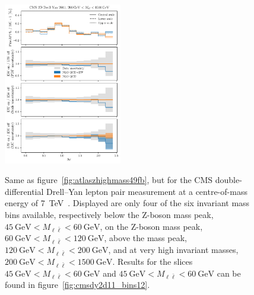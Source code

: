 \begin{figure}[!p]
    \includegraphics[width=0.46\textwidth]{figures/pineappl_CMSDY2D11_bin6}\\
    \caption{Same as figure~\ref{fig:atlaszhighmass49fb}, but for the CMS
      double-differential Drell--Yan lepton pair measurement at a
      centre-of-mass energy of \SI{7}{\tera\electronvolt}~\cite{Chatrchyan:2013tia}. Displayed are
      only four of the six invariant mass bins available, respectively below the
      Z-boson mass peak, $\SI{45}{\giga\electronvolt}<M_{\ell\bar\ell}<\SI{60}{\giga\electronvolt}$, on the Z-boson mass
      peak, $\SI{60}{\giga\electronvolt}<M_{\ell\bar\ell}<\SI{120}{\giga\electronvolt}$, above the mass peak,
      $\SI{120}{\giga\electronvolt}<M_{\ell\bar\ell}<\SI{200}{\giga\electronvolt}$, and at very high invariant masses,
      $\SI{200}{\giga\electronvolt}<M_{\ell\bar\ell}<\SI{1500}{\giga\electronvolt}$.
      Results for the slices $\SI{45}{\giga\electronvolt}<M_{\ell\bar\ell}<\SI{60}{\giga\electronvolt}$ and $\SI{45}{\giga\electronvolt}<M_{\ell\bar\ell}<\SI{60}{\giga\electronvolt}$ can be found in figure~\ref{fig:cmsdy2d11_bins12}.}
    \label{fig:cmsdy2d11_bins3456}
\end{figure}

